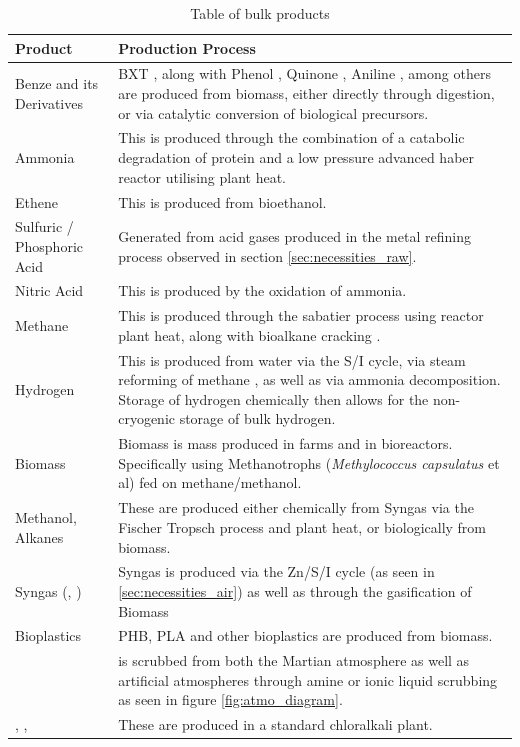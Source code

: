 \documentclass[fleqn,10pt]{Stylesheet} %
\begin{document}
\begin{table}

\centering
\begin{tabular}{|m{4cm}|L|}\hline
\textbf{Product} & \textbf{Production Process} \\\hline
Benze and its Derivatives &	BXT \cite{QingfengChe2019}, along with Phenol \cite{2001Gibson}, Quinone \cite{NingqingRan2001}, Aniline \cite{Pharkya2020}, among others \cite{JianLi2017} are produced from biomass, either directly through digestion, or via catalytic conversion of biological precursors. \\\hline
Ammonia & This is produced through the combination of a catabolic degradation of protein \cite{KwonYoungChoi2014} and a low pressure advanced haber reactor \cite{BosongLin2019} utilising plant heat.\\\hline
Ethene & This is produced from bioethanol.\\\hline
Sulfuric / Phosphoric Acid &  Generated from acid gases produced in the metal refining process observed in section \ref{sec:necessities_raw}. \\\hline
Nitric Acid & This is produced by the oxidation of ammonia.\\\hline
Methane & This is produced through the sabatier \cite{JohnBucknell2014} process using reactor plant heat, along with bioalkane cracking \cite{2004JoseComas, XWang2002}.\\\hline
Hydrogen &  This is produced from water via the S/I cycle, via steam reforming of methane \cite{JianhuaTong2006}, as well as via ammonia decomposition. Storage of hydrogen chemically then allows for the non-cryogenic storage of bulk hydrogen.\\\hline
Biomass & Biomass is mass produced in farms and in bioreactors. Specifically using Methanotrophs (\textit{Methylococcus capsulatus} et al) fed on methane/methanol. \\\hline
Methanol, Alkanes & These are produced either chemically from Syngas via the Fischer Tropsch process and plant heat, or biologically from biomass. \\\hline
Syngas (, ) & Syngas is produced via the Zn/S/I cycle (as seen in \ref{sec:necessities_air}) as well as through the gasification of Biomass \\\hline
Bioplastics & PHB, PLA and other bioplastics are produced from biomass. \\\hline
{} &  is scrubbed from both the Martian atmosphere as well as artificial atmospheres through amine or ionic liquid scrubbing \cite{Lotto2018,StephenYates2016} as seen in figure \ref{fig:atmo_diagram}. \\\hline
{}, ,  & These are produced in a standard chloralkali plant. \\\hline
\end{tabular}
\caption{Table of bulk products} %
\label{tab:bulk_products}
\end{table}
\end{document}
